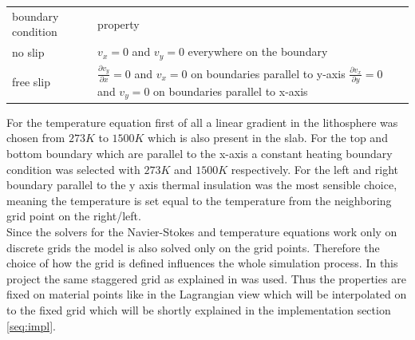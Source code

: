 \documentclass[12pt]{scrartcl}
\begin{document}
\begin{tabular}{ll}
boundary condition&property\\
no slip&$v_x=0$ and $v_y=0$ everywhere on the boundary\\
free slip&\makecell[l]{ $\frac{\partial v_y}{\partial x}=0$ and $v_x=0$ on boundaries parallel to y-axis\\$\frac{\partial v_x}{\partial y}=0$ and $v_y=0$ on boundaries parallel to x-axis }
\end{tabular}
For the temperature equation first of all a linear gradient in the lithosphere was chosen from $273K$ to $1500K$ which is also present in the slab. For the top and bottom boundary which are parallel to the x-axis a constant heating boundary condition was selected with $273K$ and $1500K$ respectively. For the left and right boundary parallel to the y axis thermal insulation was the most sensible choice, meaning the temperature is set equal to the temperature from the neighboring grid point on the right/left.\\

Since the solvers for the Navier-Stokes and temperature equations work only on discrete grids the model is also solved only on the grid points. Therefore the choice of how the grid is defined influences the whole simulation process. In this project the same staggered grid as explained in \cite{gerya2009introduction} was used. Thus the properties are fixed on material points like in the Lagrangian view which will be interpolated on to the fixed grid which will be shortly explained in the implementation section \ref{seq:impl}.
\end{document}
